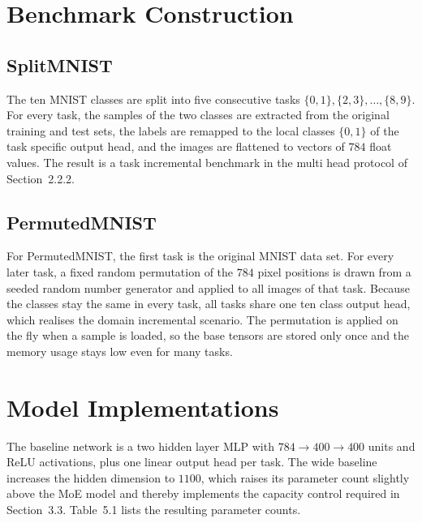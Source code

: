 \section{Benchmark Construction}
\label{sec:implbench}

\subsection{SplitMNIST}

The ten MNIST classes are split into five consecutive tasks
$\{0,1\}, \{2,3\}, \dots, \{8,9\}$. For every task, the samples of the two
classes are extracted from the original training and test sets, the labels
are remapped to the local classes $\{0,1\}$ of the task specific output
head, and the images are flattened to vectors of $784$ float values. The
result is a task incremental benchmark in the multi head protocol of
Section~2.2.2.

\subsection{PermutedMNIST}

For PermutedMNIST, the first task is the original MNIST data set. For every
later task, a fixed random permutation of the $784$ pixel positions is
drawn from a seeded random number generator and applied to all images of
that task. Because the classes stay the same in every task, all tasks share
one ten class output head, which realises the domain incremental scenario.
The permutation is applied on the fly when a sample is loaded, so the base
tensors are stored only once and the memory usage stays low even for many
tasks.

\section{Model Implementations}
\label{sec:implmodels}

The baseline network is a two hidden layer MLP with
$784 \rightarrow 400 \rightarrow 400$ units and ReLU activations, plus one
linear output head per task. The wide baseline increases the hidden
dimension to $1100$, which raises its parameter count slightly above the
MoE model and thereby implements the capacity control required in
Section~3.3. Table~5.1 lists the resulting parameter counts.

